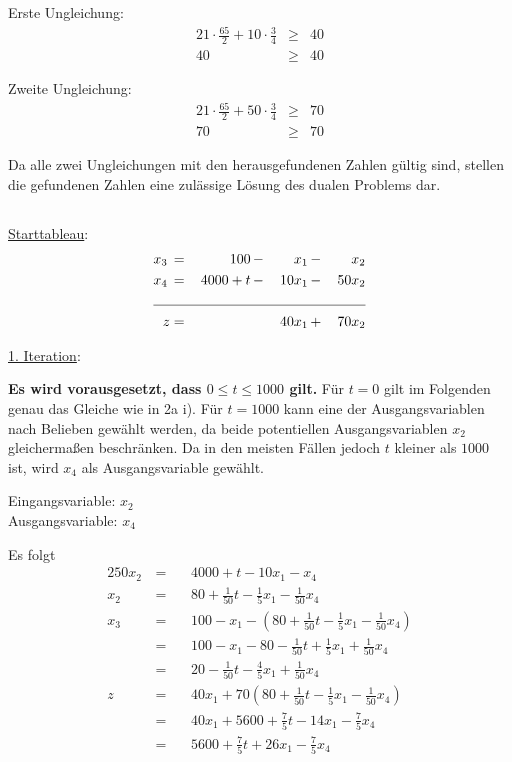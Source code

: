 \documentclass[10pt,a4paper,oneside,ngerman,numbers=noenddot]{scrartcl}
\begin{document}
			Erste Ungleichung:
			\begin{alignat*}{2}
				1 \cdot \frac{65}{2} + 10 \cdot \frac{3}{4} &\geq & 40 \\
				40 &\geq & 40
			\end{alignat*}
		
			Zweite Ungleichung:
			\begin{alignat*}{2}
				1 \cdot \frac{65}{2} + 50 \cdot \frac{3}{4} &\geq & 70 \\
				70 &\geq & 70
			\end{alignat*}
			
			Da alle zwei Ungleichungen mit den herausgefundenen Zahlen gültig sind, stellen die gefundenen Zahlen eine zulässige Lösung des dualen Problems dar.
	\subsection{} %
		\underline{Starttableau}:
			\begin{alignat*}{4}
				x_{3} \,&=&\, 100 \,&-&\, x_{1} \,&-&\, x_{2} \\
				x_{4} \,&=&\, 4000 + t \,&-&\, 10x_{1} \,&-&\, 50x_{2} \\ \cline{1 - 7}
				z &=& &&\, 40x_{1} \,&+&\, 70x_{2}
			\end{alignat*}
			
			\underline{1. Iteration}:
			
			\textbf{Es wird vorausgesetzt, dass $0 \leq t \leq 1000$ gilt.} Für $t=0$ gilt im Folgenden genau das Gleiche wie in 2a i). Für $t=1000$ kann eine der Ausgangsvariablen nach Belieben gewählt werden, da beide potentiellen Ausgangsvariablen $x_{2}$ gleichermaßen beschränken. Da in den meisten Fällen jedoch $t$ kleiner als $1000$ ist, wird $x_{4}$ als Ausgangsvariable gewählt.
		
			Eingangsvariable: $x_{2}$\\
			Ausgangsvariable: $x_{4}$
		
			Es folgt
			\begin{alignat*}{2}
				50x_{2} \,&=&&\, 4000 + t - 10x_{1} - x_{4} \\
				x_{2} \,&=&&\, 80 + \frac{1}{50}t - \frac{1}{5}x_{1} - \frac{1}{50}x_{4} \\
				x_{3} \,&=&&\, 100 - x_{1} - \left(80  + \frac{1}{50}t - \frac{1}{5}x_{1} - \frac{1}{50}x_{4}\right) \\
				&=&&\, 100 - x_{1} - 80 - \frac{1}{50}t + \frac{1}{5}x_{1} + \frac{1}{50}x_{4} \\
				&=&&\, 20 - \frac{1}{50}t - \frac{4}{5}x_{1} + \frac{1}{50}x_{4} \\
				z \,&=&&\, 40x_{1} + 70\left(80 + \frac{1}{50}t - \frac{1}{5}x_{1} - \frac{1}{50}x_{4}\right) \\
				&=&&\, 40x_{1} + 5600 + \frac{7}{5}t - 14x_{1} - \frac{7}{5}x_{4} \\
				&=&&\, 5600 + \frac{7}{5}t + 26x_{1} - \frac{7}{5}x_{4}
			\end{alignat*}
		
\end{document}
